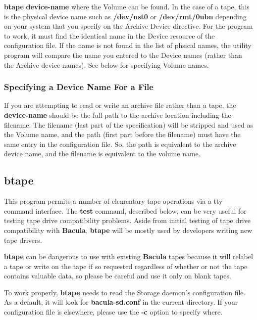 {\bf btape} {\bf device-name} where the Volume can be found. In the case of a
tape, this is the physical device name such as {\bf /dev/nst0} or {\bf
/dev/rmt/0ubn} depending on your system that you specify on the Archive Device
directive. For the program to work, it must find the identical name in the
Device resource of the configuration file. If the name is not found in the
list of phsical names, the utility program will compare the name you entered
to the Device names (rather than the Archive device names). See below for
specifying Volume names. 

\subsubsection*{Specifying a Device Name For a File}

If you are attempting to read or write an archive file rather than a tape, the
{\bf device-name} should be the full path to the archive location including
the filename. The filename (last part of the specification) will be stripped
and used as the Volume name, and the path (first part before the filename)
must have the same entry in the configuration file. So, the path is equivalent
to the archive device name, and the filename is equivalent to the volume name.


\subsection*{btape}
\label{btape1}

This program permits a number of elementary tape operations via a tty command
interface. The {\bf test} command, described below, can be very useful for
testing tape drive compatibility problems. Aside from initial testing of tape
drive compatibility with {\bf Bacula}, {\bf btape} will be mostly used by
developers writing new tape drivers. 

{\bf btape} can be dangerous to use with existing {\bf Bacula} tapes because
it will relabel a tape or write on the tape if so requested regardless of
whether or not the tape contains valuable data, so please be careful and use
it only on blank tapes. 

To work properly, {\bf btape} needs to read the Storage daemon's configuration
file. As a default, it will look for {\bf bacula-sd.conf} in the current
directory. If your configuration file is elsewhere, please use the {\bf -c}
option to specify where. 

